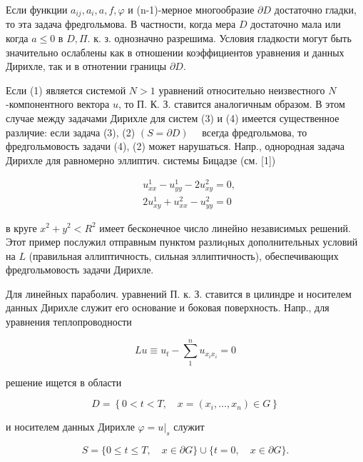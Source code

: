 \documentclass[10pt]{article}
\begin{document}
Если функции $a_{i j}, a_{i}, a, f, \varphi$ и (n-1)-мерное многообразие $\partial D$ достаточно гладки, то эта задача фредгольмова. В частности, когда мера $D$ достаточно мала или когда $a \leqslant 0$ в $D, \Pi$. к. з. однозначно разрешима. Условия гладкости могут быть значительно ослаблены как в отношении коэффициентов уравнения и данных Дирихле, так и в отнотении границы $\partial D$.



Если (1) является системой $N>1$ уравнений относительно неизвестного $N$-компонентного вектора $u$, то П. К. З. ставится аналогичным образом. В этом случае между задачами Дирихле для систем (3) и (4) имеется существенное разлиุчие: если задача (3), (2) $(S=\partial D) \quad$ всегда фредгольмова, то фредгольмовость задачи (4), (2) может нарушаться. Напр., однородная задача Дирихле для равномерно эллиптич. системы Бицадзе (см. [1])



\[

\begin{aligned}

& u_{x x}^{1}-u_{y y}^{1}-2 u_{x y}^{2}=0, \\

& 2 u_{x y}^{1}+u_{x x}^{2}-u_{y y}^{2}=0

\end{aligned}

\]



в круге $x^{2}+y^{2}<R^{2}$ имеет бесконечное число линейно независимых решений. Этот пример послужил отправным пунктом разлиqных дополнительных условий на $L$ (правильная әллиптичность, сильная эллиптичность), обеспечивающих фредгольмовость задачи Дирихле.



Для линейных параболич. уравнений П. к. З. ставится в цилиндре и носителем данных Дирихле служит его основание и боковая поверхность. Напр., для уравнения теплопроводности



\[

L u \equiv u_{t}-\sum_{1}^{n} u_{x_{i} x_{i}}=0

\]



решение ищется в области



\[

D=\left\{0<t<T, \quad x=\left(x_{i}, \ldots, x_{n}\right) \in G\right\}

\]



и носителем данных Дирихле $\varphi=\left.u\right|_{s}$ служит



\[

S=\{0 \leqslant t \leqslant T, \quad x \in \partial G\} \cup\{t=0, \quad x \in \partial G\} .

\]
\end{document}
